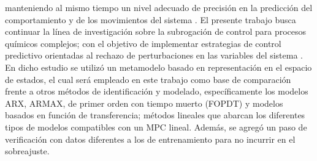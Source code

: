manteniendo al mismo tiempo un nivel adecuado de precisión en la predicción del comportamiento y 
de los movimientos del sistema \cite{ref8, ref9}. El presente trabajo busca continuar la línea 
de investigación sobre la subrogación de control para procesos químicos complejos; 
con el objetivo de implementar estrategias de control predictivo orientadas al 
rechazo de perturbaciones en las variables del sistema \cite{ref10}. 
En dicho estudio se utilizó un metamodelo basado en representación en el espacio de estados, 
el cual será empleado en este trabajo como base de comparación frente a otros métodos de 
identificación y modelado, específicamente los modelos ARX, ARMAX, de primer orden con 
tiempo muerto (FOPDT) y modelos basados en función de transferencia; métodos lineales que 
abarcan los diferentes tipos de modelos compatibles con un MPC lineal. Además, se agregó 
un paso de verificación con datos diferentes a los de entrenamiento para no incurrir en el sobreajuste.
